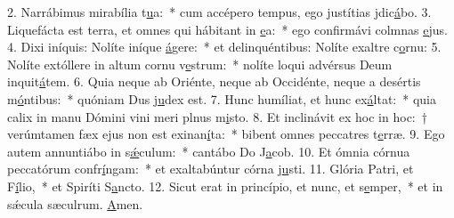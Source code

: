 2. Narrábimus mirabília t\uline{u}a:~* cum accépero tempus, ego justítias jdic\uline{á}bo.
3. Liquefácta est terra, et omnes qui hábitant in \uline{e}a:~* ego confirmávi colmnas \uline{e}jus.
4. Dixi iníquis: Nolíte iníque \uline{á}gere:~* et delinquéntibus: Nolíte exaltre c\uline{o}rnu:
5. Nolíte extóllere in altum cornu v\uline{e}strum:~* nolíte loqui advérsus Deum inquit\uline{á}tem.
6. Quia neque ab Oriénte, neque ab Occidénte, neque a desértis m\uline{ó}ntibus:~* quóniam Dus j\uline{u}dex est.
7. Hunc humíliat, et hunc ex\uline{á}ltat:~* quia calix in manu Dómini vini meri plnus m\uline{i}sto.
8. Et inclinávit ex hoc in hoc:~† verúmtamen fæx ejus non est exinan\uline{í}ta:~* bibent omnes peccatres t\uline{e}rræ.
9. Ego autem annuntiábo in s\uline{ǽ}culum:~* cantábo Do J\uline{a}cob.
10. Et ómnia córnua peccatórum confr\uline{í}ngam:~* et exaltabúntur córna j\uline{u}sti.
11. Glória Patri, et F\uline{í}lio,~* et Spiríti S\uline{a}ncto.
12. Sicut erat in princípio, et nunc, et s\uline{e}mper,~* et in sǽcula sæculrum. \uline{A}men.
